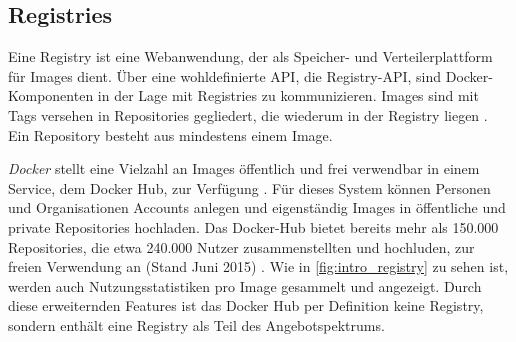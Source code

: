 \documentclass[../main.tex]{subfiles}
\begin{document}


		\subsection{Registries}
		\label{dockerRegistries}
      Eine Registry ist eine Webanwendung, der als Speicher- und Verteilerplattform für Images dient. Über eine wohldefinierte API, die Registry-API, sind Docker-Komponenten in der Lage mit Registries zu kommunizieren. Images sind mit Tags versehen in Repositories gegliedert, die wiederum in der Registry liegen \cite{dockerRegistry}. Ein Repository besteht aus mindestens einem Image.

      \emph{Docker} stellt eine Vielzahl an Images öffentlich und frei verwendbar in einem Service, dem Docker Hub, zur Verfügung \cite[S.11]{dockerBook}\cite[S.3]{dockerSec1}\cite{dockerRegistry}. Für dieses System können Personen und Organisationen Accounts anlegen und eigenständig Images in öffentliche und private Repositories hochladen. Das Docker-Hub bietet bereits mehr als 150.000 Repositories, die etwa 240.000 Nutzer zusammenstellten und hochluden, zur freien Verwendung an (Stand Juni 2015) \cite[S.16]{slideshareDockercon15}. Wie in \fig \ref{fig:intro_registry} zu sehen ist, werden auch Nutzungsstatistiken pro Image gesammelt und angezeigt. Durch diese erweiternden Features ist das Docker Hub per Definition keine Registry, sondern enthält eine Registry als Teil des Angebotspektrums. %
\end{document}
